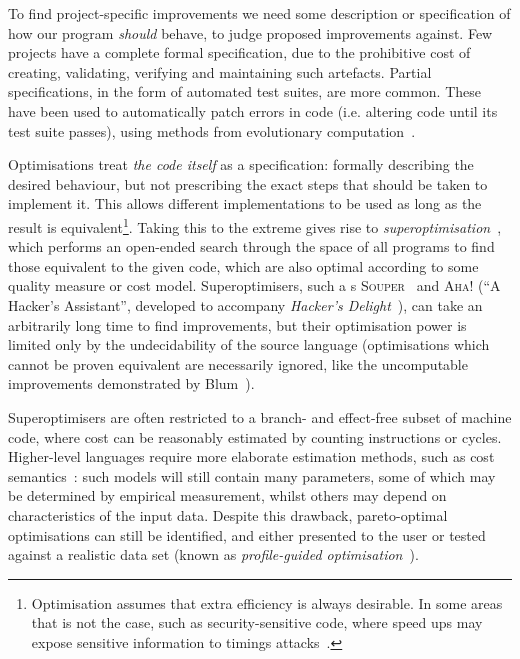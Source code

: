 To find project-specific improvements we need some description or specification
of how our program \emph{should} behave, to judge proposed improvements against.
Few projects have a complete formal specification, due to the prohibitive cost
of creating, validating, verifying and maintaining such artefacts. Partial
specifications, in the form of automated test suites, are more common. These
have been used to automatically patch errors in code (i.e. altering code until
its test suite passes), using methods from evolutionary
computation~\cite{Forrest.Nguyen.Weimer.ea:2009,weimer2009automatically,Schulte.Forrest.Weimer:2010}.

Optimisations treat \emph{the code itself} as a specification: formally
describing the desired behaviour, but not prescribing the exact steps that
should be taken to implement it. This allows different implementations to be
used as long as the result is equivalent\footnote{Optimisation assumes that
  extra efficiency is always desirable. In some areas that is not the case, such
  as security-sensitive code, where speed ups may expose sensitive information
  to timings attacks~\cite{kocher1996timing}.}. Taking this to the extreme gives
rise to \emph{superoptimisation}~\cite{massalin1987superoptimizer}, which
performs an open-ended search through the space of all programs to find those
equivalent to the given code, which are also optimal according to some quality
measure or cost model. Superoptimisers, such a
s \textsc{Souper}~\cite{sasnauskas2017souper} and \textsc{Aha!} (``A Hacker's
Assistant'', developed to accompany \emph{Hacker's
  Delight}~\cite{warren2013hacker}), can take an arbitrarily long time to find
improvements, but their optimisation power is limited only by the undecidability
of the source language (optimisations which cannot be proven equivalent are
necessarily ignored, like the uncomputable improvements demonstrated by
Blum~\cite{blum1967machine}).

Superoptimisers are often restricted to a branch- and effect-free subset of
machine code, where cost can be reasonably estimated by counting instructions or
cycles. Higher-level languages require more elaborate estimation methods, such
as cost semantics~\cite{danner2015denotational}: such models will still contain
many parameters, some of which may be determined by empirical measurement,
whilst others may depend on characteristics of the input data. Despite this
drawback, pareto-optimal optimisations can still be identified, and either
presented to the user or tested against a realistic data set (known as
\emph{profile-guided optimisation}~\cite{hubicka2005profile}).

